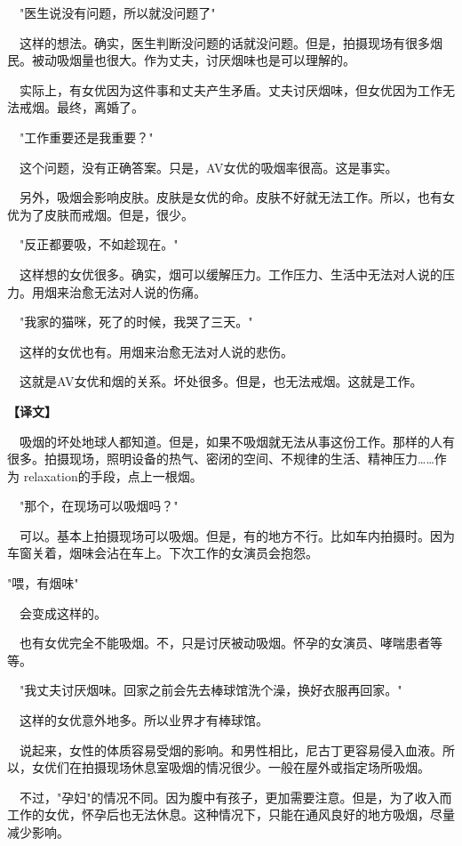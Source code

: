 \documentclass[12pt,UTF8]{ctexbook}
\begin{document}
{{　"医生说没有问题，所以就没问题了"

　这样的想法。确实，医生判断没问题的话就没问题。但是，拍摄现场有很多烟民。被动吸烟量也很大。作为丈夫，讨厌烟味也是可以理解的。

　实际上，有女优因为这件事和丈夫产生矛盾。丈夫讨厌烟味，但女优因为工作无法戒烟。最终，离婚了。

　"工作重要还是我重要？"

　这个问题，没有正确答案。只是，AV女优的吸烟率很高。这是事实。

　另外，吸烟会影响皮肤。皮肤是女优的命。皮肤不好就无法工作。所以，也有女优为了皮肤而戒烟。但是，很少。

　"反正都要吸，不如趁现在。"

　这样想的女优很多。确实，烟可以缓解压力。工作压力、生活中无法对人说的压力。用烟来治愈无法对人说的伤痛。

　"我家的猫咪，死了的时候，我哭了三天。"

　这样的女优也有。用烟来治愈无法对人说的悲伤。

　这就是AV女优和烟的关系。坏处很多。但是，也无法戒烟。这就是工作。
}

\vspace{2ex}
\parbox{0.9\linewidth}{
\textbf{【译文】}\par

　吸烟的坏处地球人都知道。但是，如果不吸烟就无法从事这份工作。那样的人有很多。拍摄现场，照明设备的热气、密闭的空间、不规律的生活、精神压力……作为 relaxation的手段，点上一根烟。

　"那个，在现场可以吸烟吗？"

　可以。基本上拍摄现场可以吸烟。但是，有的地方不行。比如车内拍摄时。因为车窗关着，烟味会沾在车上。下次工作的女演员会抱怨。

"喂，有烟味"

　会变成这样的。

　也有女优完全不能吸烟。不，只是讨厌被动吸烟。怀孕的女演员、哮喘患者等等。

　"我丈夫讨厌烟味。回家之前会先去棒球馆洗个澡，换好衣服再回家。"

　这样的女优意外地多。所以业界才有棒球馆。

　说起来，女性的体质容易受烟的影响。和男性相比，尼古丁更容易侵入血液。所以，女优们在拍摄现场休息室吸烟的情况很少。一般在屋外或指定场所吸烟。

　不过，"孕妇"的情况不同。因为腹中有孩子，更加需要注意。但是，为了收入而工作的女优，怀孕后也无法休息。这种情况下，只能在通风良好的地方吸烟，尽量减少影响。

}}
\end{document}
